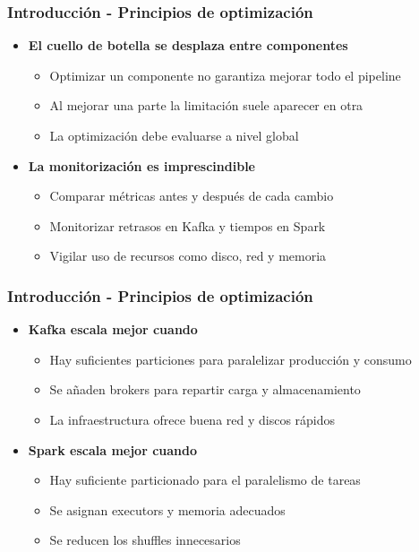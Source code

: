 \documentclass[aspectratio=169]{beamer}
\begin{document}
\begin{frame}\frametitle{Introducción - Principios de optimización}
\begin{itemize}
  \item \textbf{El cuello de botella se desplaza entre componentes}
  \begin{itemize}
    \item Optimizar un componente no garantiza mejorar todo el pipeline
    \item Al mejorar una parte la limitación suele aparecer en otra
    \item La optimización debe evaluarse a nivel global
  \end{itemize}

  \vspace{1em}

  \item \textbf{La monitorización es imprescindible}
  \begin{itemize}
    \item Comparar métricas antes y después de cada cambio
    \item Monitorizar retrasos en Kafka y tiempos en Spark
    \item Vigilar uso de recursos como disco, red y memoria
  \end{itemize}
\end{itemize}
\end{frame}


\begin{frame}\frametitle{Introducción - Principios de optimización}
\begin{itemize}

  \item \textbf{Kafka escala mejor cuando}
  \begin{itemize}
    \item Hay suficientes particiones para paralelizar producción y consumo
    \item Se añaden brokers para repartir carga y almacenamiento
    \item La infraestructura ofrece buena red y discos rápidos
  \end{itemize}

  \vspace{0.8em}

  \item \textbf{Spark escala mejor cuando}
  \begin{itemize}
    \item Hay suficiente particionado para el paralelismo de tareas
    \item Se asignan executors y memoria adecuados
    \item Se reducen los shuffles innecesarios
  \end{itemize}
\end{itemize}
\end{frame}
\end{document}
